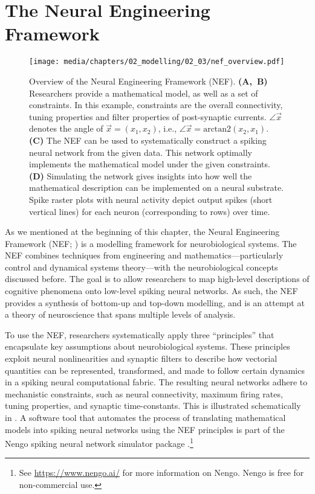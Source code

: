
\section{The Neural Engineering Framework}
\label{sec:nef}

\begin{figure}[p]
	\texttt{[image: media/chapters/02\_modelling/02\_03/nef\_overview.pdf]}
	\caption[Overview of the Neural Engineering Framework]{Overview of the Neural Engineering Framework (NEF).
	\textbf{(A,~B)} Researchers provide a mathematical model, as well as a set of constraints.
	In this example, constraints are the overall connectivity, tuning properties and filter properties of post-synaptic currents. $\angle \vec x$ denotes the angle of $\vec x = (x_1, x_2)$, i.e., $\angle \vec x = \mathrm{arctan2}(x_2, x_1)$. \textbf{(C)} The NEF can be used to systematically construct a spiking neural network from the given data. This network optimally implements the mathematical model under the given constraints.
	\textbf{(D)} Simulating the network gives insights into how well the mathematical description can be implemented on a neural substrate.
	Spike raster plots with neural activity depict output spikes (short vertical lines) for each neuron (corresponding to rows) over time.}
	\label{fig:nef_overview}
\end{figure}

As we mentioned at the beginning of this chapter, the Neural Engineering Framework (NEF; \cite{eliasmith2003neural}) is a modelling framework for neurobiological systems.
The NEF combines techniques from engineering and mathematics---particularly control and dynamical systems theory---with the neurobiological concepts discussed before.
The goal is to allow researchers to map high-level descriptions of cognitive phenomena onto low-level spiking neural networks.
As such, the NEF provides a synthesis of bottom-up and top-down modelling, and is an attempt at a theory of neuroscience that spans multiple levels of analysis.

To use the NEF, researchers systematically apply three \enquote{principles} that encapsulate key assumptions about neurobiological systems.
These principles exploit neural nonlinearities and synaptic filters to describe how vectorial quantities can be represented, transformed, and made to follow certain dynamics in a spiking neural computational fabric.
The resulting neural networks adhere to mechanistic constraints, such as neural connectivity, maximum firing rates, tuning properties, and synaptic time-constants.
This is illustrated schematically in .
A software tool that automates the process of translating mathematical models into spiking neural networks using the NEF principles is part of the Nengo spiking neural network simulator package \citep{bekolay2014nengo}.\footnote{See \url{https://www.nengo.ai/} for more information on Nengo. Nengo is free for non-commercial use.}


